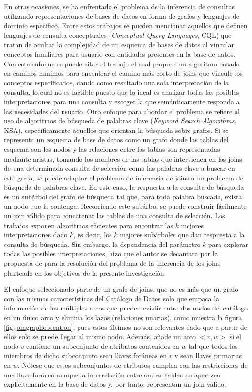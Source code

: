 En otras ocasiones, se ha enfrentado el problema de la inferencia de consultas utilizando representaciones
de bases de datos en forma de grafos y lenguajes 
de dominio específico. Entre estos trabajos se pueden mencionar aquellos que definen lenguajes de consulta 
conceptuales (\emph{Conceptual Query Languages}, CQL) que tratan de ocultar la complejidad de un esquema de bases de 
datos al vincular conceptos familiares para usuario con entidades presentes en la base de datos. Con este enfoque 
se puede citar el trabajo \cite{owei2001enriching} el cual propone
un algoritmo basado en caminos mínimos para encontrar el camino m\'as corto de joins que vincule los conceptos 
especificados, dando como resultado una sola interpretación de la consulta, lo cual no es factible 
puesto que lo ideal es analizar todas las posibles interpretaciones para una consulta y escoger la 
que sem\'anticamente responda a las necesidades del usuario. Otro enfoque para abordar el problema 
se refiere al uso de algoritmos de búsqueda de palabras clave (\emph{Keyword Search Algorithms}, KSA), específicamente  
aquellos que orientan la búsqueda sobre grafos. Si se representa un esquema de base de datos como un grafo
donde las tablas del esquema son los nodos y las relaciones entre las tablas son representadas mediante 
aristas, tomando los nombres de las tablas que intervienen en los joins de una determinada consulta de selección 
como las palabras clave a buscar en este grafo, se puede adaptar el problema de inferencia de joins 
a un problema de búsqueda de palabras clave. En este caso, la respuesta a la consulta de búsqueda 
es un sub\'arbol del grafo de búsqueda 
tal que, para toda palabra buscada, exista un nodo que la contenga. Recorriendo este sub\'arbol se puede construir 
f\'acilmente un join v\'alido para concatenar las tablas de una consulta de selección. Los trabajos 
\cite{kimelfeld2006finding,hristidis2003efficient,he2007blinks} exponen algoritmos eficientes para 
encontrar las $k$ mejores interpretaciones dado $k$, es decir, los $k$ mejores sub\'arboles que dan respuesta 
a la consulta de búsqueda. Sin embargo, la dependencia del parámetro $k$ para explorar todas las posibles 
interpretaciones,  
hizo que el autor se decantara por la propuesta de \cite{mason2005autojoin} para la resolución 
del problema de la inferencia de los joins planteado en los objetivos de la presente investigación.

El enfoque seleccionado parte de un grafo de joins, que no es m\'as que un grafo con las mismas características 
del Catálogo de Datos solo que empaca la información de los múltiples arcos que pueden existir entre 
dos nodos del catálogo en un \'unico arco y elimina los lazos (relaciones unarias), como muestra la 
figura \ref{fig:joingraphobtention}, pues estos \'ultimos no son 
relevantes dado que a partir de ellos solo se puede llegar al mismo nodo. Además, añade un arco $<v, w>$ si el nodo $v$ contiene un subconjunto 
de atributos contenidos en $w$ tal que todos los miembros de dicho subconjunto sean llaves for\'aneas en $v$
y sean llaves primarias en $w$. Nótese que estos subconjuntos de atributos cumplen con las restricciones 
de una llave for\'anea aunque la interrelación entre ambas tablas no aparezca explícitamente en la base de 
datos y, por tanto, representan un join válido.

